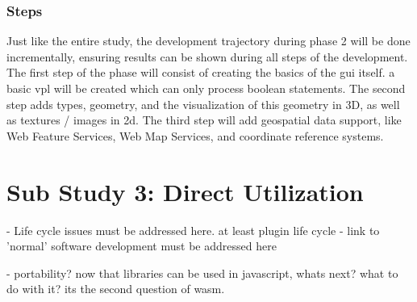 \subsubsection*{Steps}

Just like the entire study, the development trajectory during phase 2 will be done incrementally, ensuring results can be shown during all steps of the development. 
The first step of the phase will consist of creating the basics of the \ac{gui} itself. a basic \ac{vpl} will be created which can only process boolean statements. The second step adds types, geometry, and the visualization of this geometry in 3D, as well as textures / images in 2d. The third step will add geospatial data support, like Web Feature Services, Web Map Services, and coordinate reference systems.  


\section{Sub Study 3: Direct Utilization}
\label{sec:method-three}
\mySubRQThree

\begin{note}
  - Life cycle issues must be addressed here. at least plugin life cycle
  - link to 'normal' software development must be addressed here 

  - portability? now that libraries can be used in javascript, whats next? what to do with it? its the second question of wasm.

\end{note}






